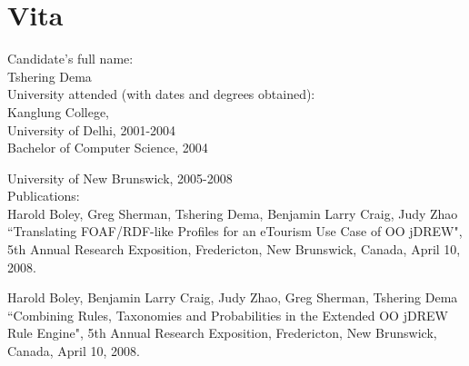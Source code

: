 \chapter*{Vita}
\pagestyle{empty}
\thispagestyle{empty}
Candidate's full name: \\

Tshering Dema\\

University attended (with dates and degrees obtained):\\
Kanglung College,\\
University of Delhi, 2001-2004\\
Bachelor of Computer Science, 2004

\bigskip
    
University of New Brunswick, 2005-2008\\

Publications:\\

Harold Boley, Greg Sherman, Tshering Dema, Benjamin Larry Craig, Judy Zhao ``Translating FOAF/RDF-like Profiles for an eTourism Use Case of OO jDREW", 5th Annual Research Exposition, Fredericton, New Brunswick, Canada, April 10, 2008.

\bigskip
  
Harold Boley, Benjamin Larry Craig, Judy Zhao, Greg Sherman, Tshering Dema  ``Combining Rules, Taxonomies and Probabilities in the Extended OO jDREW Rule Engine", 5th Annual Research Exposition, Fredericton, New Brunswick, Canada, April 10, 2008.
\pagebreak

